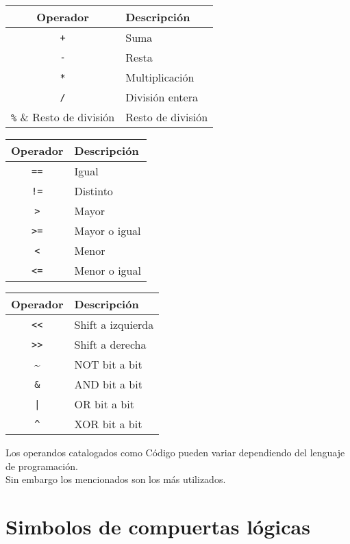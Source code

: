 \documentclass[a4paper,10pt]{article}
\begin{document}
\begin{multicols}{3}
    \begin{tabular}{c|p{2.40cm}}
    \small Operador & \small Descripción\\
    \hline
    \verb|+|  & \small Suma           \\
    \verb|-|  & \small Resta          \\
    \verb|*|  & \small Multiplicación \\
    \verb|/|  & \small División entera \\
    \verb|%|  & \small Resto de división\\ 
    \end{tabular}
\columnbreak
    \begin{tabular}{c|p{2.40cm}}
    \small Operador & \small Descripción\\
    \hline
    \verb|==| & \small Igual          \\
    \verb|!=| & \small Distinto       \\
    \verb|>|  & \small Mayor          \\
    \verb|>=| & \small Mayor o igual    \\
    \verb|<|  & \small Menor          \\
    \verb|<=| & \small Menor o igual    \\
    \end{tabular}
\columnbreak
    \begin{tabular}{c|p{2.40cm}}
    \small Operador & \small Descripción\\
    \hline
    \verb|<<| & \small Shift a izquierda \\
    \verb|>>| & \small Shift a derecha   \\
    \hline
    \textasciitilde  & \small NOT bit a bit  \\
    \verb|&|  & \small AND bit a bit  \\
    \verb.|.  & \small OR bit a bit   \\
    \verb|^|  & \small XOR bit a bit  \\
    \end{tabular}
\end{multicols}

Los operandos catalogados como Código pueden variar dependiendo del lenguaje de programación.\\
Sin embargo los mencionados son los más utilizados.

\section*{Simbolos de compuertas lógicas}
\end{document}
